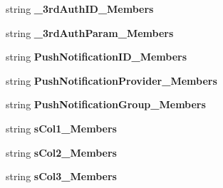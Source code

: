 \begin{DoxyCompactItemize}
\item 
string {\bfseries \+\_\+3rd\+Auth\+I\+D\+\_\+\+Members}\hypertarget{a00077_ad7be4c8a173d7b73c955d87a33a182a8}{}\label{a00077_ad7be4c8a173d7b73c955d87a33a182a8}

\item 
string {\bfseries \+\_\+3rd\+Auth\+Param\+\_\+\+Members}\hypertarget{a00077_ae1089ccf6314718b6df4945906cabc39}{}\label{a00077_ae1089ccf6314718b6df4945906cabc39}

\item 
string {\bfseries Push\+Notification\+I\+D\+\_\+\+Members}\hypertarget{a00077_a5528faf168b85ffbcc480b2f048ca953}{}\label{a00077_a5528faf168b85ffbcc480b2f048ca953}

\item 
string {\bfseries Push\+Notification\+Provider\+\_\+\+Members}\hypertarget{a00077_a341d638d04fe626f8d9c88e3f8958b24}{}\label{a00077_a341d638d04fe626f8d9c88e3f8958b24}

\item 
string {\bfseries Push\+Notification\+Group\+\_\+\+Members}\hypertarget{a00077_a1a07bd8d2b94787db6526df087de9218}{}\label{a00077_a1a07bd8d2b94787db6526df087de9218}

\item 
string {\bfseries s\+Col1\+\_\+\+Members}\hypertarget{a00077_a0bbfe41dcc2bb784e682ff466cee9f9b}{}\label{a00077_a0bbfe41dcc2bb784e682ff466cee9f9b}

\item 
string {\bfseries s\+Col2\+\_\+\+Members}\hypertarget{a00077_a54b14c5824bfc5cb103fbe705c20bcf5}{}\label{a00077_a54b14c5824bfc5cb103fbe705c20bcf5}

\item 
string {\bfseries s\+Col3\+\_\+\+Members}\hypertarget{a00077_af7217b4279bb1a62584a9d25f35ecae1}{}\label{a00077_af7217b4279bb1a62584a9d25f35ecae1}


\end{DoxyCompactItemize}
